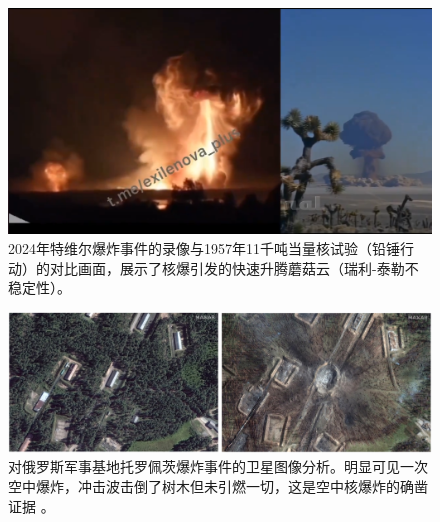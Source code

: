 \documentclass[10pt,twocolumn,letterpaper]{article}
\begin{document}
\begin{figure}[t]
\begin{center}
\includegraphics[width=1\textwidth]{tver.png}
\end{center}
   \caption{2024年特维尔爆炸事件的录像与1957年11千吨当量核试验（铅锤行动）的对比画面，展示了核爆引发的快速升腾蘑菇云（瑞利-泰勒不稳定性）\cite{24}。}
   \label{fig:12}
\end{figure}
\begin{figure}[t]
\begin{center}
\includegraphics[width=1\textwidth]{toropets.png}
\end{center}
   \caption{对俄罗斯军事基地托罗佩茨爆炸事件的卫星图像分析。明显可见一次空中爆炸，冲击波击倒了树木但未引燃一切，这是空中核爆炸的确凿证据 \cite{24}。}
   \label{fig:13}
\end{figure}
\end{document}
